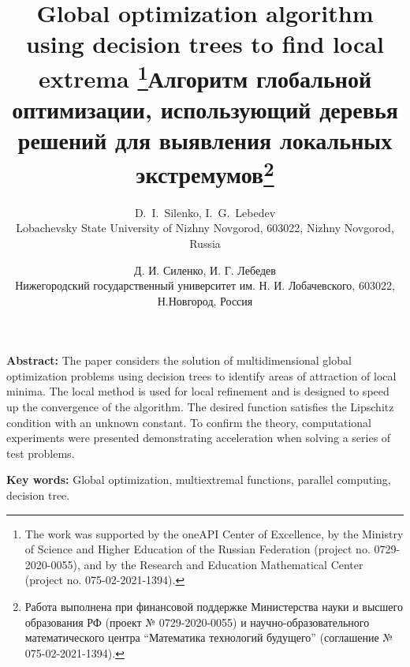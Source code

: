 \documentclass[12pt, a4paper, russian]{article}
\begin{document}

\title{Global optimization algorithm using decision trees to find local extrema \thanks{The work was supported by the oneAPI Center of Excellence, by the Ministry of Science and Higher Education of the Russian Federation (project no. 0729-2020-0055), and by the Research and Education Mathematical Center (project no.  075-02-2021-1394).}}

\author{D.~I.~Silenko, I.~G.~Lebedev\\
	\small{Lobachevsky State University of Nizhny Novgorod, 603022, Nizhny Novgorod, Russia}
}
\date{}
\maketitle

\begin{small}
\textbf{Abstract:} The paper considers the solution of multidimensional global optimization problems using decision trees to identify areas of attraction of local minima. The local method is used for local refinement and is designed to speed up the convergence of the algorithm. The desired function satisfies the Lipschitz condition with an unknown constant. To confirm the theory, computational experiments were presented demonstrating acceleration when solving a series of test problems.

\textbf{Key words:} Global optimization, multiextremal functions, parallel computing, decision tree.
\end{small}

\renewcommand{\refname}{References}





\emptythanks
\title{Алгоритм глобальной оптимизации, использующий деревья решений для выявления локальных экстремумов\thanks{Работа выполнена при финансовой поддержке Министерства науки и высшего образования РФ (проект № 0729-2020-0055) и научно-образовательного математического центра “Математика технологий будущего” (соглашение № 075-02-2021-1394).}}

\author{Д. И. Силенко, И. Г. Лебедев\\
	\small{Нижегородский государственный университет им. Н. И. Лобачевского, 603022, Н.Новгород, Россия} 
}
\date{}
\maketitle
\end{document}
